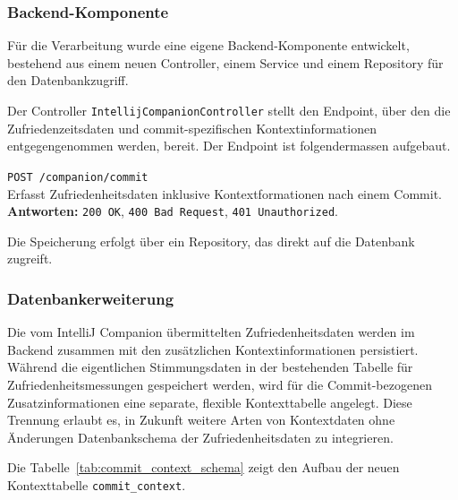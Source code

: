 \documentclass[12pt,a4paper]{report}
\begin{document}
\subsubsection{Backend-Komponente}

Für die Verarbeitung wurde eine eigene Backend-Komponente entwickelt, bestehend aus einem neuen Controller, einem Service und
einem Repository für den Datenbankzugriff. 

Der Controller \texttt{IntellijCompanionController} stellt den Endpoint, über den die Zufriedenzeitsdaten und commit-spezifischen
Kontextinformationen entgegengenommen werden, bereit. Der Endpoint ist folgendermassen aufgebaut.

\begin{description}
  \item \texttt{POST /companion/commit} \\
        Erfasst Zufriedenheitsdaten inklusive Kontextformationen nach einem Commit. \\
        \textbf{Antworten:} \texttt{200 OK}, \texttt{400 Bad Request}, \texttt{401 Unauthorized}.
\end{description}

Die Speicherung erfolgt über ein Repository, das direkt auf die Datenbank zugreift.

\subsubsection{Datenbankerweiterung}

Die vom IntelliJ Companion übermittelten Zufriedenheitsdaten werden im Backend zusammen mit den zusätzlichen Kontextinformationen
persistiert. Während die eigentlichen Stimmungsdaten in der bestehenden Tabelle für Zufriedenheitsmessungen gespeichert werden,
wird für die Commit-bezogenen Zusatzinformationen eine separate, flexible Kontexttabelle angelegt. Diese Trennung erlaubt es, in
Zukunft weitere Arten von Kontextdaten ohne Änderungen Datenbankschema der Zufriedenheitsdaten zu integrieren.

Die Tabelle~\ref{tab:commit_context_schema} zeigt den Aufbau der neuen Kontexttabelle \texttt{commit\_context}.
\end{document}
